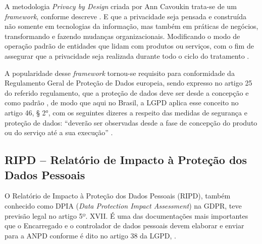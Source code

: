 \documentclass[
	12pt,				%
	openright,			%
	oneside,			%
	a4paper,			%
	english,			%
	french,				%
	spanish,			%
	brazil,				%
	]{abntex2}
\begin{document}
A metodologia \textit{Privacy by Design} criada por Ann Cavoukin trata-se de um \textit{framework}, conforme descreve . E que a privacidade seja pensada e construída não somente em tecnologias da informação, mas também em práticas de negócios, transformando e fazendo mudanças organizacionais. Modificando o modo de operação padrão de entidades que lidam com produtos ou serviços, com o fim de assegurar que a privacidade seja realizada durante todo o ciclo do tratamento \cite{Ana2019}.

A popularidade desse \textit{framework} tornou-se requisito para conformidade da Regulamento Geral de Proteção de Dados europeia, sendo expresso no artigo 25 do referido  regulamento, que a proteção de dados deve ser desde a concepção e como padrão \cite{oliveira2020}, de modo que aqui no Brasil, a LGPD aplica esse conceito no artigo 46, § 2°, com os seguintes dizeres a respeito das medidas de segurança e proteção de dados: “deverão ser observadas desde a fase de concepção do produto ou do serviço até a sua execução” \cite{01-01-LeiGeral}.


\subsection{ RIPD – Relatório de Impacto à Proteção dos Dados Pessoais  }

O Relatório de Impacto à Proteção dos Dados Pessoais (RIPD), também conhecido como DPIA (\textit{Data Protection Impact Assessment}) na GDPR, teve previsão legal no artigo 5º. XVII. É uma das documentações mais importantes que o Encarregado e o controlador de dados pessoais devem elaborar e enviar para a ANPD conforme é dito no artigo 38 da LGPD, \cite{01-01-LeiGeral}.
\end{document}
